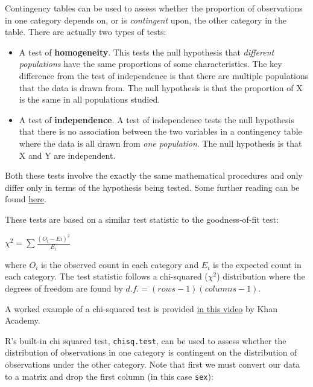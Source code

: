 \documentclass[
  12pt,
]{krantz}
\providecommand{\tightlist}{%
  \setlength{\itemsep}{0pt}\setlength{\parskip}{0pt}}
\begin{document}
Contingency tables can be used to assess whether the proportion of observations in one category depends on, or is \emph{contingent} upon, the other category in the table. There are actually two types of tests:

\begin{itemize}
\tightlist
\item
  A test of \textbf{homogeneity}. This tests the null hypothesis that \emph{different populations} have the same proportions of some characteristics. The key difference from the test of independence is that there are multiple populations that the data is drawn from. The null hypothesis is that the proportion of X is the same in all populations studied.
\item
  A test of \textbf{independence}. A test of independence tests the null hypothesis that there is no association between the two variables in a contingency table where the data is all drawn from \emph{one population}. The null hypothesis is that X and Y are independent.
\end{itemize}

Both these tests involve the exactly the same mathematical procedures and only differ only in terms of the hypothesis being tested. Some further reading can be found \href{http://www.u.arizona.edu/~kuchi/Courses/MAT167/Files/LH_LEC.0640.HypTest.IndepHomog.pdf}{here}.

These tests are based on a similar test statistic to the goodness-of-fit test:

\begin{center}

\(\chi^2 = \sum \frac{(O_i - Ei)^2}{E_i}\)

\end{center}

where \(O_i\) is the observed count in each category and \(E_i\) is the expected count in each category.
The test statistic follows a chi-squared (\(\chi^2\)) distribution where the degrees of freedom are found by \(d.f. = (rows - 1)(columns - 1 )\).

A worked example of a chi-squared test is provided \href{https://www.khanacademy.org/math/statistics-probability/inference-categorical-data-chi-square-tests/chi-square-tests-for-homogeneity-and-association-independence/v/chi-square-test-homogeneity}{in this video} by Khan Academy.

R's built-in chi squared test, \texttt{chisq.test}, can be used to assess whether the distribution of observations in one category is contingent on the distribution of observations under the other category. Note that first we must convert our data to a matrix and drop the first column (in this case \texttt{sex}):
\end{document}
